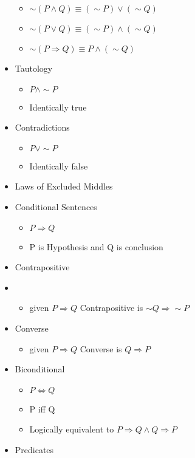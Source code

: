 \documentclass{article}
\begin{document}
\begin{itemize}
    \begin{itemize}
        \item $\sim (P \land Q) \equiv (\sim P) \lor (\sim Q) $
        \item $\sim (P \lor Q) \equiv (\sim P) \land (\sim Q) $
        \item $\sim (P \Rightarrow Q) \equiv P \land (\sim Q)$
    \end{itemize}
    \item Tautology
    \begin{itemize}
        \item $P \land \sim P$
        \item Identically true
    \end{itemize}
    \item Contradictions
    \begin{itemize}
        \item  $P  \lor \sim P$
        \item Identically false
    \end{itemize}
    \item Laws of Excluded Middles
    \item Conditional Sentences
    \begin{itemize}
        \item $P \Rightarrow Q$
        \item P is Hypothesis and Q is conclusion
    \end{itemize}
    \item Contrapositive
    \item \begin{itemize}
        \item given $P \Rightarrow Q$ Contrapositive is $\sim Q \Rightarrow \sim P$
    \end{itemize}
    \item Converse
    \begin{itemize}
        \item given $P \Rightarrow Q$ Converse is $ Q \Rightarrow P$ 
    \end{itemize}
    \item Biconditional
    \begin{itemize}
        \item $P \Leftrightarrow Q$ 
        \item P iff Q
        \item Logically equivalent to $P \Rightarrow Q \land Q \Rightarrow P $
    \end{itemize}
    \item Predicates

\end{itemize}
\end{document}
